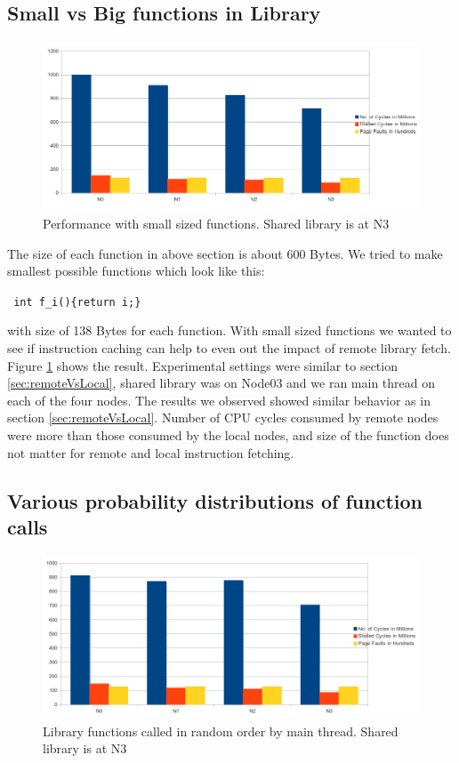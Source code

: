 \subsection{Small vs Big functions in Library}

\begin{figure}
    \centering
    \includegraphics[scale=0.35]{smallFunc.png}
    \caption{Performance with small sized functions. Shared library is at N3 }
    \label{fig:smallFunc}
\end{figure}

The size of each function in above section is about 600 Bytes.
We tried to make smallest possible functions which look like this:

\texttt{ int f_i()\{return i;\} }

with size of 138 Bytes for each function.
With small sized functions we wanted to see if instruction caching can help to even out the impact of remote library fetch.
Figure \ref{fig:smallFunc} shows the result.
Experimental settings were similar to section \ref{sec:remoteVsLocal}, shared library was on Node03 and we ran main thread on each of the four nodes.
The results we observed showed similar behavior as in section \ref{sec:remoteVsLocal}.
Number of CPU cycles consumed by remote nodes were more than those consumed by the local nodes, and size of the function does not matter for remote and local instruction fetching.



\subsection{Various probability distributions of function calls}

\begin{figure}
    \centering
    \includegraphics[scale=0.35]{randomDistribution.png}
    \caption{Library functions called in random order by main thread. Shared library is at N3 }
    \label{fig:randomDistribution}
\end{figure}

